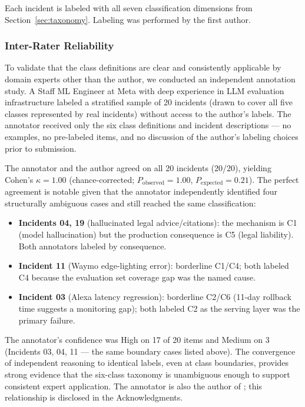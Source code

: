 \documentclass{article}
\begin{document}
Each incident is labeled with all seven classification dimensions from
Section~\ref{sec:taxonomy}.  Labeling was performed by the first author.

\subsubsection*{Inter-Rater Reliability}
\label{sec:irr}

To validate that the class definitions are clear and consistently applicable
by domain experts other than the author, we conducted an independent annotation
study.  A Staff ML Engineer at Meta with deep experience in LLM evaluation
infrastructure labeled a stratified sample of 20 incidents (drawn to cover all
five classes represented by real incidents) without access to the author's
labels.  The annotator received only the six class definitions and incident
descriptions --- no examples, no pre-labeled items, and no discussion of the
author's labeling choices prior to submission.

The annotator and the author agreed on all 20 incidents (20/20), yielding
Cohen's $\kappa = 1.00$ (chance-corrected; $P_{\text{observed}} = 1.00$,
$P_{\text{expected}} = 0.21$).  The perfect agreement is notable given that
the annotator independently identified four structurally ambiguous cases and
still reached the same classification:

\begin{itemize}
  \item \textbf{Incidents 04, 19} (hallucinated legal advice/citations): the
    mechanism is C1 (model hallucination) but the production consequence is
    C5 (legal liability). Both annotators labeled by consequence.
  \item \textbf{Incident 11} (Waymo edge-lighting error): borderline C1/C4;
    both labeled C4 because the evaluation set coverage gap was the named cause.
  \item \textbf{Incident 03} (Alexa latency regression): borderline C2/C6
    (11-day rollback time suggests a monitoring gap); both labeled C2 as the
    serving layer was the primary failure.
\end{itemize}

The annotator's confidence was High on 17 of 20 items and Medium on 3 (Incidents
03, 04, 11 --- the same boundary cases listed above).  The convergence of
independent reasoning to identical labels, even at class boundaries, provides
strong evidence that the six-class taxonomy is unambiguous enough to support
consistent expert application.  The annotator is also the author of
\citet{pandey2026evaluating}; this relationship is disclosed in the
Acknowledgments.
\end{document}
